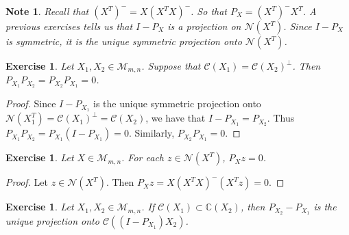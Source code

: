 \documentclass[12pt]{amsart}
\newtheorem{note}[thm]{Note}
\newtheorem{ex}[thm]{Exercise}
\newcommand{\C}{\mathbb{C}}
\newcommand{\MC}{\mathcal{C}}
\newcommand{\MN}{\mathcal{N}}
\newcommand{\MM}{\mathcal{M}}
\begin{document}
\begin{note}
Recall that $(X^T)^- = X(X^TX)^-$. So that $P_X = (X^T)^-X^T$. A previous exercises tells us that $I-P_X$ is a projection on $\MN(X^T)$. Since $I-P_X$ is symmetric, it is the unique symmetric projection onto $\MN(X^T)$. 
\end{note}

\begin{ex}
Let $X_1, X_2 \in \MM_{m,n}$. Suppose that $\MC(X_1) = \MC(X_2)^{\perp}$. Then $P_{X_1}P_{X_2} = P_{X_2}P_{X_1} = 0$.  
\end{ex}

\begin{proof}
Since $I-P_{X_1}$ is the unique symmetric projection onto $\MN(X_1^T) = \MC(X_1)^{\perp} = \MC(X_2)$, we have that $I-P_{X_1} = P_{X_2}$. Thus $P_{X_1}P_{X_2} = P_{X_1}(I-P_{X_1}) = 0$. Similarly, $P_{X_2}P_{X_1} = 0$.
\end{proof}

\begin{ex}
Let $X \in \MM_{m,n}$. For each $z \in \MN(X^T)$, $P_Xz = 0$.
\end{ex}

\begin{proof}
Let $z \in \MN(X^T)$. Then $P_Xz = X(X^TX)^-(X^Tz) = 0$.
\end{proof}

\begin{ex}
Let $X_1,X_2 \in \MM_{m,n}$. If $\MC(X_1) \subset \C(X_2)$, then $P_{X_2} - P_{X_1}$ is the unique projection onto $\MC((I-P_{X_1})X_2)$.
\end{ex}
\end{document}

